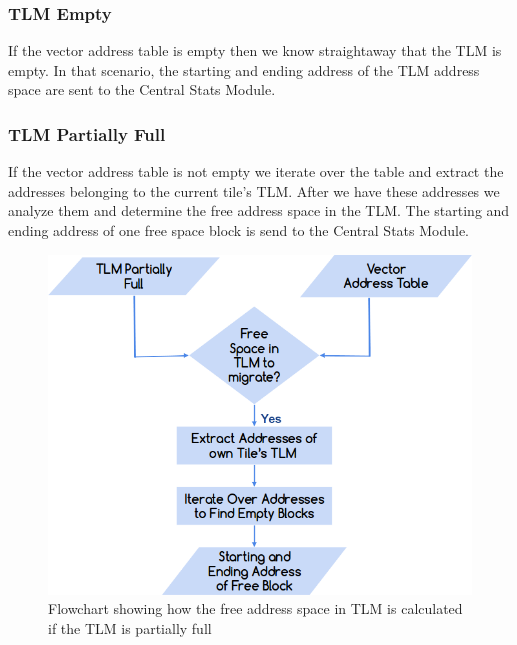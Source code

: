 \documentclass{listhesis}
\begin{document}
\subsubsection{TLM Empty}
If the vector address table is empty then we know straightaway that the TLM is empty. In that scenario, the starting and ending address of the TLM address space are sent to the Central Stats Module.\\ 
\subsubsection{TLM Partially Full}
If the vector address table is not empty we iterate over the table and extract the addresses belonging to the current tile's TLM. After we have these addresses we analyze them and determine the free address space in the TLM. The starting and ending address of one free space block is send to the Central Stats Module.\\
\begin{figure}
  \includegraphics[width=\linewidth]{tlmpartiallyempty.png}
  \centering
  \caption{Flowchart showing how the free address space in TLM is calculated if the TLM is partially full}
  \label{fig:freeSpaceTLM}
\end{figure}
\end{document}
